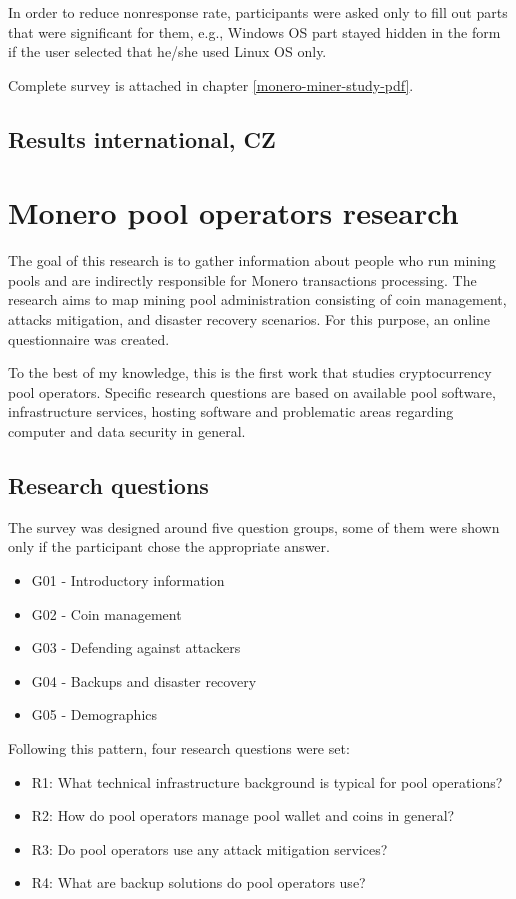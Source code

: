 \documentclass[
  printed, %
  table,   %
  nolof,     %
  nolot,     %
           oneside, color
]{fithesis3}
\begin{document}
In order to reduce nonresponse rate, participants were asked only to fill out parts that were significant for them, e.g., Windows OS part stayed hidden in the form if the user selected that he/she used Linux OS only. 

Complete survey is attached in chapter \ref{monero-miner-study-pdf}.
\section{Results international, CZ}



\chapter{Monero pool operators research}
The goal of this research is to gather information about people who run mining pools and are indirectly responsible for Monero transactions processing. The research aims to map mining pool administration consisting of coin management, attacks mitigation, and disaster recovery scenarios. For this purpose, an online questionnaire was created. 

To the best of my knowledge, this is the first work that studies cryptocurrency pool operators. Specific research questions are based on available pool software, infrastructure services, hosting software and problematic areas regarding computer and data security in general.

\section{Research questions}

The survey was designed around five question groups, some of them were shown only if the participant chose the appropriate answer.
\begin{itemize}\itemsep0em
\item G01 - Introductory information
\item G02 - Coin management
\item G03 - Defending against attackers
\item G04 - Backups and disaster recovery
\item G05 - Demographics
\end{itemize}
Following this pattern, four research questions were set:
\begin{itemize}\itemsep0em
\item R1: What technical infrastructure background is typical for pool operations?
\item R2: How do pool operators manage pool wallet and coins in general?
\item R3: Do pool operators use any attack mitigation services?
\item R4: What are backup solutions do pool operators use?
\end{itemize}
\end{document}
